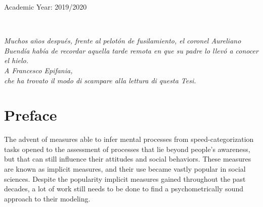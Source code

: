 \documentclass[12pt]{book}
\begin{document}
\vspace{2cm}
	
	\begin{center}
		Academic Year: 2019/2020
	\end{center}
	
	
\newpage 

\ 
\thispagestyle{empty}

\newpage
	
	
	\vspace*{5cm}
	\thispagestyle{empty}
	
	\begin{multicols}{2}
		\vspace*{\textheight}
		\columnbreak
		\begin{flushright}
			\slshape \onehalfspacing
			Muchos años después, frente al pelotón de fusilamiento, el coronel Aureliano Buendía había de recordar aquella tarde remota en que su padre lo llevó a conocer el hielo.
			\\ \vspace{2cm} A Francesco Epifania, \\ che ha trovato il modo di scampare alla lettura di questa Tesi. \\
		\end{flushright}
		
	\end{multicols}
	

	
	\tableofcontents
	

	
	\chapter{Preface} \label{chap:preface}
	The advent of measures able to infer mental processes from  speed-categorization tasks opened to the assessment of processes that lie beyond people's awareness, but that can still influence their attitudes and social behaviors. 
	These measures are known as implicit measures, and their use became vastly popular in social sciences.
	Despite the popularity implicit measures gained throughout the past decades, a lot of work still needs to be done to find a psychometrically sound approach to their modeling.
	
\end{document}
